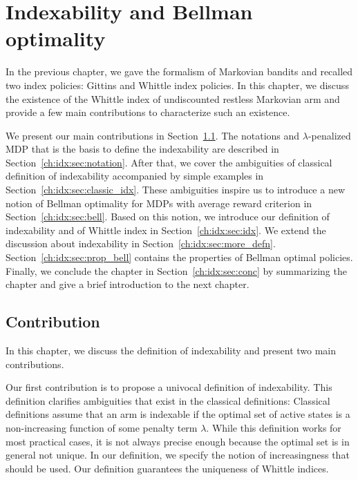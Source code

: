 \begingroup

\let\clearpage\relax

\chapter{Indexability and Bellman optimality}
\label{ch:indexability}

In the previous chapter, we gave the formalism of Markovian bandits and recalled two index policies: Gittins and Whittle index policies.
In this chapter, we discuss the existence of the Whittle index of undiscounted restless Markovian arm and provide a few main contributions to characterize such an existence.

We present our main contributions in Section~\ref{ch:idx:sec:contrib}. The notations and $\lambda$-penalized MDP that is the basis to define the indexability are described in Section~\ref{ch:idx:sec:notation}.
After that, we cover the ambiguities of classical definition of indexability accompanied by simple examples in Section~\ref{ch:idx:sec:classic_idx}.
These ambiguities inspire us to introduce a new notion of Bellman optimality for MDPs with average reward criterion in Section~\ref{ch:idx:sec:bell}.
Based on this notion, we introduce our definition of indexability and of Whittle index in Section~\ref{ch:idx:sec:idx}.
We extend the discussion about indexability in Section~\ref{ch:idx:sec:more_defn}.
Section~\ref{ch:idx:sec:prop_bell} contains the properties of Bellman optimal policies.
Finally, we conclude the chapter in Section~\ref{ch:idx:sec:conc} by summarizing the chapter and give a brief introduction to the next chapter.


\section{Contribution}
\label{ch:idx:sec:contrib}

In this chapter, we discuss the definition of indexability and present two main contributions.

Our first contribution is to propose a univocal definition of indexability. This definition clarifies ambiguities that exist in the classical definitions: Classical definitions assume that an arm is indexable if the optimal set of active states is a non-increasing function of some penalty term $\lambda$. While this definition works for most practical cases, it is not always precise enough because the optimal set is in general not unique. In our definition, we specify the notion of increasingness that should be used. Our definition guarantees the uniqueness of Whittle indices.

